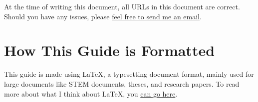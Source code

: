 At the time of writing this document, all URLs in this document are correct.
Should you have any issues, please
\underline{\href{mailto:HusseinEsmailContact@gmail.com}{feel free to send me an
email}}.

\section{How This Guide is Formatted}
This guide is made using \LaTeX{}, a typesetting document format, mainly used
for large documents like STEM documents, theses, and research papers. To read
more about what I think about \LaTeX{}, you
\href{https://husseinesmail.xyz/articles/is-latex-better.html}{can go here}.


